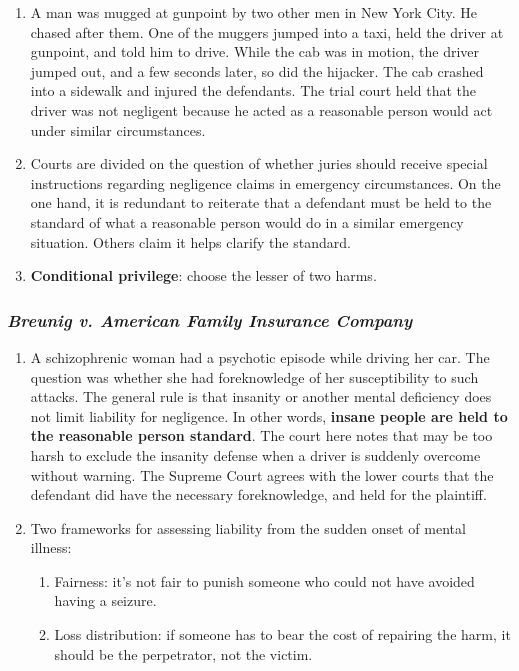 \begin{enumerate}
    \item A man was mugged at gunpoint by two other men in New York City. He chased after them. One of the muggers jumped into a taxi, held the driver at gunpoint, and told him to drive. While the cab was in motion, the driver jumped out, and a few seconds later, so did the hijacker. The cab crashed into a sidewalk and injured the defendants. The trial court held that the driver was not negligent because he acted as a reasonable person would act under similar circumstances.
    \item Courts are divided on the question of whether juries should receive special instructions regarding negligence claims in emergency circumstances. On the one hand, it is redundant to reiterate that a defendant must be held to the standard of what a reasonable person would do in a similar emergency situation. Others claim it helps clarify the standard.
    \item \textbf{Conditional privilege}: choose the lesser of two harms.
\end{enumerate}

\subsubsection{\emph{Breunig v. American Family Insurance Company}}

\begin{enumerate}
    \item A schizophrenic woman had a psychotic episode while driving her car. The question was whether she had foreknowledge of her susceptibility to such attacks. The general rule is that insanity or another mental deficiency does not limit liability for negligence. In other words, \textbf{insane people are held to the reasonable person standard}. The court here notes that may be too harsh to exclude the insanity defense when a driver is suddenly overcome without warning. The Supreme Court agrees with the lower courts that the defendant did have the necessary foreknowledge, and held for the plaintiff. 
    \item Two frameworks for assessing liability from the sudden onset of mental illness:
    \begin{enumerate}
        \item Fairness: it's not fair to punish someone who could not have avoided having a seizure.
        \item Loss distribution: if someone has to bear the cost of repairing the harm, it should be the perpetrator, not the victim.
    \end{enumerate}
\end{enumerate}

